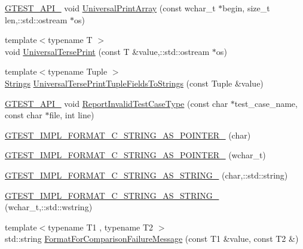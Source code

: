 \begin{DoxyCompactItemize}
\item 
\hyperlink{gtest-port_8h_aa73be6f0ba4a7456180a94904ce17790}{G\-T\-E\-S\-T\-\_\-\-A\-P\-I\-\_\-} void \hyperlink{namespacetesting_1_1internal_ae95ea0aea80977c0870df98b27a17cac}{Universal\-Print\-Array} (const wchar\-\_\-t $\ast$begin, size\-\_\-t len,\-::std\-::ostream $\ast$os)
\item 
{\footnotesize template$<$typename T $>$ }\\void \hyperlink{namespacetesting_1_1internal_ab3d834fb6c31d29e36400cc19905294b}{Universal\-Terse\-Print} (const T \&value,\-::std\-::ostream $\ast$os)
\item 
{\footnotesize template$<$typename Tuple $>$ }\\\hyperlink{namespacetesting_1_1internal_a7706b17f05f4b49e351b052ae4e05073}{Strings} \hyperlink{namespacetesting_1_1internal_a7e60d1478b074801c766eeee9be6c772}{Universal\-Terse\-Print\-Tuple\-Fields\-To\-Strings} (const Tuple \&value)
\item 
\hyperlink{gtest-port_8h_aa73be6f0ba4a7456180a94904ce17790}{G\-T\-E\-S\-T\-\_\-\-A\-P\-I\-\_\-} void \hyperlink{namespacetesting_1_1internal_a864171ad4983f5b8e4258d0d5db0c03b}{Report\-Invalid\-Test\-Case\-Type} (const char $\ast$test\-\_\-case\-\_\-name, const char $\ast$file, int line)
\item 
\hyperlink{namespacetesting_1_1internal_a3682f962ae0ec1c0eca6444ca0a09e91}{G\-T\-E\-S\-T\-\_\-\-I\-M\-P\-L\-\_\-\-F\-O\-R\-M\-A\-T\-\_\-\-C\-\_\-\-S\-T\-R\-I\-N\-G\-\_\-\-A\-S\-\_\-\-P\-O\-I\-N\-T\-E\-R\-\_\-} (char)
\item 
\hyperlink{namespacetesting_1_1internal_a85e08f00d443221e529a0a85a90fbaeb}{G\-T\-E\-S\-T\-\_\-\-I\-M\-P\-L\-\_\-\-F\-O\-R\-M\-A\-T\-\_\-\-C\-\_\-\-S\-T\-R\-I\-N\-G\-\_\-\-A\-S\-\_\-\-P\-O\-I\-N\-T\-E\-R\-\_\-} (wchar\-\_\-t)
\item 
\hyperlink{namespacetesting_1_1internal_a9dceb71a64d780beb2db1ed5bf24ad3f}{G\-T\-E\-S\-T\-\_\-\-I\-M\-P\-L\-\_\-\-F\-O\-R\-M\-A\-T\-\_\-\-C\-\_\-\-S\-T\-R\-I\-N\-G\-\_\-\-A\-S\-\_\-\-S\-T\-R\-I\-N\-G\-\_\-} (char,\-::std\-::string)
\item 
\hyperlink{namespacetesting_1_1internal_afaec8a5f66e926e86cd5abed5254ff36}{G\-T\-E\-S\-T\-\_\-\-I\-M\-P\-L\-\_\-\-F\-O\-R\-M\-A\-T\-\_\-\-C\-\_\-\-S\-T\-R\-I\-N\-G\-\_\-\-A\-S\-\_\-\-S\-T\-R\-I\-N\-G\-\_\-} (wchar\-\_\-t,\-::std\-::wstring)
\item 
{\footnotesize template$<$typename T1 , typename T2 $>$ }\\std\-::string \hyperlink{namespacetesting_1_1internal_a91ab078f10adc669f09b7f604975c518}{Format\-For\-Comparison\-Failure\-Message} (const T1 \&value, const T2 \&)

\end{DoxyCompactItemize}
